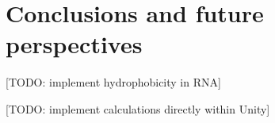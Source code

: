 \chapter{Conclusions and future perspectives} %

[TODO: implement hydrophobicity in RNA]

[TODO: implement calculations directly within Unity]
